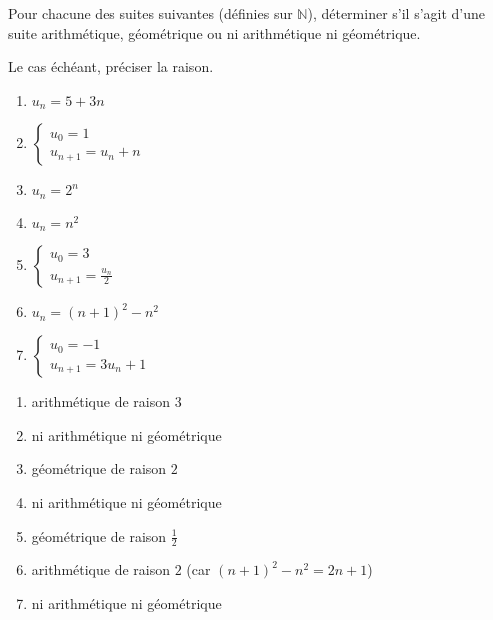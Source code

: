 
%
Pour chacune des suites suivantes (définies sur $\mathbb{N}$), déterminer s'il s'agit d'une suite arithmétique, géométrique ou ni arithmétique ni géométrique.
\par
Le cas échéant, préciser la raison.
\begin{enumerate}
     \item
     $u_{n}=5+3n$
     \item
     $\left\{ \begin{matrix} u_{0}=1 \\ u_{n+1} = u_{n}+n\end{matrix}\right.$
          \item
          $u_{n}=2^{n}$
          \item
          $u_{n}=n^{2}$
          \item
          $\left\{ \begin{matrix} u_{0}=3 \\ u_{n+1} = \frac{u_{n}}{2}\end{matrix}\right.$
               \item
               $u_{n}=\left(n+1\right)^{2}-n^{2}$
               \item
               $\left\{ \begin{matrix} u_{0}=-1 \\ u_{n+1}=3u_{n}+1 \end{matrix}\right.$
               \end{enumerate}
               \begin{corrige}
                   \begin{enumerate}
                         \item
                         arithmétique de raison $3$
                         \item
                         ni arithmétique ni géométrique
                         \item
                         géométrique de raison $2$
                         \item
                         ni arithmétique ni géométrique
                         \item
                         géométrique de raison $\frac{1}{2}$
                         \item
                         arithmétique de raison $2$ (car $\left(n+1\right)^{2}-n^{2}=2n+1$)
                         \item
                         ni arithmétique ni géométrique
                    \end{enumerate}
               \end{corrige}
